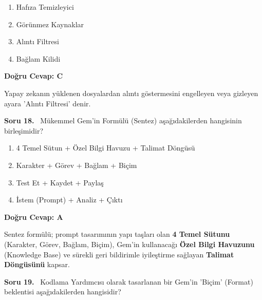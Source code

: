 \documentclass[11pt,a4paper,openany]{book}
\begin{document}
\begin{enumerate}[label=\Alph*), leftmargin=25pt, topsep=4pt, itemsep=2pt]
        \item Hafıza Temizleyici
        \item Görünmez Kaynaklar
        \item Alıntı Filtresi
        \item Bağlam Kilidi
\end{enumerate}

\vspace{4pt}
\begin{tcolorbox}[title=Cevap ve Açıklama, colback=gray!3!white, colframe=primarycolor!90!black, arc=2mm, fonttitle=\bfseries\sffamily, top=6pt, bottom=6pt]
    \textbf{Doğru Cevap: C}

    \vspace{2pt}
    Yapay zekanın yüklenen dosyalardan alıntı göstermesini engelleyen veya gizleyen ayara 'Alıntı Filtresi' denir.
\end{tcolorbox}
\vspace{10pt}
\needspace{5cm}
\vspace{8pt}
\noindent\textbf{\large\sffamily Soru 18.} \ Mükemmel Gem'in Formülü (Sentez) aşağıdakilerden hangisinin birleşimidir?

\begin{enumerate}[label=\Alph*), leftmargin=25pt, topsep=4pt, itemsep=2pt]
        \item 4 Temel Sütun + Özel Bilgi Havuzu + Talimat Döngüsü
        \item Karakter + Görev + Bağlam + Biçim
        \item Test Et + Kaydet + Paylaş
        \item İstem (Prompt) + Analiz + Çıktı
\end{enumerate}

\vspace{4pt}
\begin{tcolorbox}[title=Cevap ve Açıklama, colback=gray!3!white, colframe=primarycolor!90!black, arc=2mm, fonttitle=\bfseries\sffamily, top=6pt, bottom=6pt]
    \textbf{Doğru Cevap: A}
    
    \vspace{2pt}
    Sentez formülü; prompt tasarımının yapı taşları olan \textbf{4 Temel Sütunu} (Karakter, Görev, Bağlam, Biçim), Gem'in kullanacağı \textbf{Özel Bilgi Havuzunu} (Knowledge Base) ve sürekli geri bildirimle iyileştirme sağlayan \textbf{Talimat Döngüsünü} kapsar.
\end{tcolorbox}
\vspace{10pt}
\needspace{5cm}
\vspace{8pt}
\noindent\textbf{\large\sffamily Soru 19.} \ Kodlama Yardımcısı olarak tasarlanan bir Gem'in 'Biçim' (Format) beklentisi aşağıdakilerden hangisidir?
\end{document}
